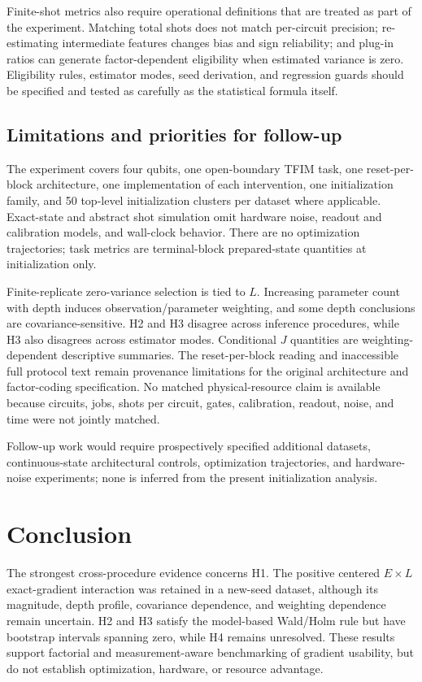\documentclass[pdflatex,sn-mathphys-num,Numbered]{sn-jnl}
\begin{document}
Finite-shot metrics also require operational definitions that are treated as part of the experiment. Matching total shots does not match per-circuit precision; re-estimating intermediate features changes bias and sign reliability; and plug-in ratios can generate factor-dependent eligibility when estimated variance is zero. Eligibility rules, estimator modes, seed derivation, and regression guards should be specified and tested as carefully as the statistical formula itself.

\subsection{Limitations and priorities for follow-up}\label{sec:limitations}

The experiment covers four qubits, one open-boundary TFIM task, one reset-per-block architecture, one implementation of each intervention, one initialization family, and 50 top-level initialization clusters per dataset where applicable. Exact-state and abstract shot simulation omit hardware noise, readout and calibration models, and wall-clock behavior. There are no optimization trajectories; task metrics are terminal-block prepared-state quantities at initialization only.

Finite-replicate zero-variance selection is tied to $L$. Increasing parameter count with depth induces observation/parameter weighting, and some depth conclusions are covariance-sensitive. H2 and H3 disagree across inference procedures, while H3 also disagrees across estimator modes. Conditional $J$ quantities are weighting-dependent descriptive summaries. The reset-per-block reading and inaccessible full protocol text remain provenance limitations for the original architecture and factor-coding specification. No matched physical-resource claim is available because circuits, jobs, shots per circuit, gates, calibration, readout, noise, and time were not jointly matched.

Follow-up work would require prospectively specified additional datasets, continuous-state architectural controls, optimization trajectories, and hardware-noise experiments; none is inferred from the present initialization analysis.

\section{Conclusion}\label{sec:conclusion}

The strongest cross-procedure evidence concerns H1. The positive centered $E\times L$ exact-gradient interaction was retained in a new-seed dataset, although its magnitude, depth profile, covariance dependence, and weighting dependence remain uncertain. H2 and H3 satisfy the model-based Wald/Holm rule but have bootstrap intervals spanning zero, while H4 remains unresolved. These results support factorial and measurement-aware benchmarking of gradient usability, but do not establish optimization, hardware, or resource advantage.
\end{document}
